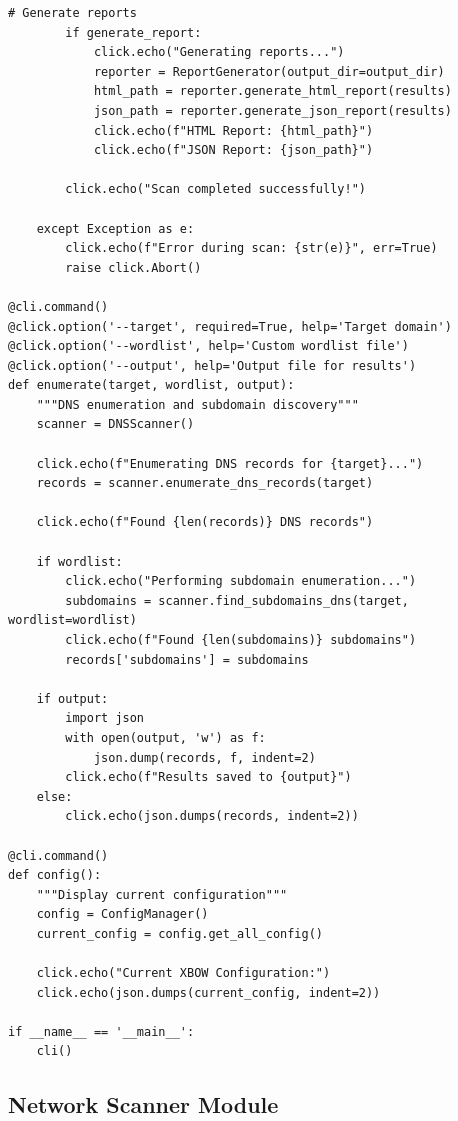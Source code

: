 \documentclass[12pt,a4paper]{report}
\begin{document}
\begin{lstlisting}[caption=CLI Module Source Code]
        # Generate reports
        if generate_report:
            click.echo("Generating reports...")
            reporter = ReportGenerator(output_dir=output_dir)
            html_path = reporter.generate_html_report(results)
            json_path = reporter.generate_json_report(results)
            click.echo(f"HTML Report: {html_path}")
            click.echo(f"JSON Report: {json_path}")
        
        click.echo("Scan completed successfully!")
        
    except Exception as e:
        click.echo(f"Error during scan: {str(e)}", err=True)
        raise click.Abort()

@cli.command()
@click.option('--target', required=True, help='Target domain')
@click.option('--wordlist', help='Custom wordlist file')
@click.option('--output', help='Output file for results')
def enumerate(target, wordlist, output):
    """DNS enumeration and subdomain discovery"""
    scanner = DNSScanner()
    
    click.echo(f"Enumerating DNS records for {target}...")
    records = scanner.enumerate_dns_records(target)
    
    click.echo(f"Found {len(records)} DNS records")
    
    if wordlist:
        click.echo("Performing subdomain enumeration...")
        subdomains = scanner.find_subdomains_dns(target, wordlist=wordlist)
        click.echo(f"Found {len(subdomains)} subdomains")
        records['subdomains'] = subdomains
    
    if output:
        import json
        with open(output, 'w') as f:
            json.dump(records, f, indent=2)
        click.echo(f"Results saved to {output}")
    else:
        click.echo(json.dumps(records, indent=2))

@cli.command()
def config():
    """Display current configuration"""
    config = ConfigManager()
    current_config = config.get_all_config()
    
    click.echo("Current XBOW Configuration:")
    click.echo(json.dumps(current_config, indent=2))

if __name__ == '__main__':
    cli()
\end{lstlisting}

\subsection{Network Scanner Module}
\end{document}
